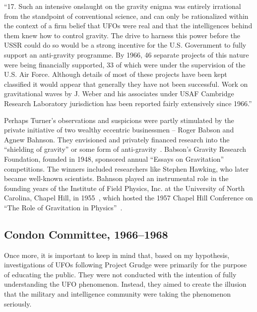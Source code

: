 \begin{svgraybox}
``17. Such an intensive onslaught on the gravity enigma was
entirely irrational from the standpoint of conventional science,
and can only be rationalized within the context of a firm belief
that UFOs were real and that the intelligences behind them knew
how to control gravity. The drive to harness this power before
the USSR could do so would be a strong incentive for the U.S.
Government to fully support an anti-gravity programme. By 1966,
46 separate projects of this nature were being financially supported,
33 of which were under the supervision of the U.S. Air Force.
Although details of most of these projects have been kept classified
it would appear that generally they have not been successful. Work
on gravitational waves by J. Weber and his associates under USAF
Cambridge Research Laboratory jurisdiction has been reported
fairly extensively since 1966.''
\end{svgraybox}

Perhaps Turner's observations and suspicions were partly stimulated by the private initiative
of two wealthy eccentric businessmen -- Roger Babson and Agnew Bahnson.
They envisioned and privately financed research into the ``shielding of gravity''
or some form of anti-gravity~\cite{Kaiser_2018}.
Babson's Gravity Research Foundation, founded in 1948, sponsored annual ``Essays on Gravitation'' competitions.
The winners included researchers like Stephen Hawking, who later became well-known scientists.
Bahnson played an instrumental role in the founding years of the Institute of Field Physics, Inc.
at the University of North Carolina, Chapel Hill, in 1955~\cite{Rickles_2021},
which hosted the 1957 Chapel Hill Conference on
``The Role of Gravitation in Physics''~\cite{Rickles2011Feb}.

\subsection{Condon Committee, 1966--1968}
\label{2023-UFO-part-Perception-types-USA-CC}

Once more, it is important to keep in mind that, based on my hypothesis, investigations of UFOs following Project Grudge were primarily for the purpose of educating the public. They were not conducted with the intention of fully understanding the UFO phenomenon. Instead, they aimed to create the illusion that the military and intelligence community were taking the phenomenon seriously.


